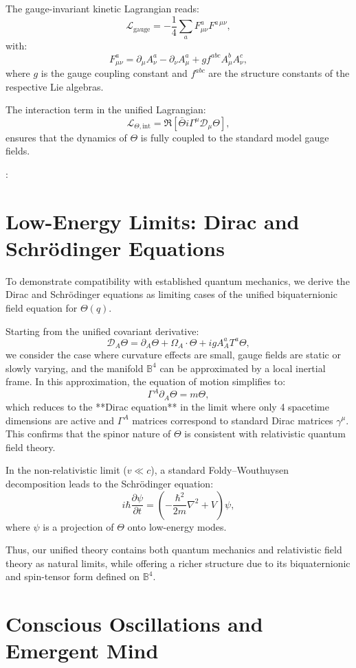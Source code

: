 \documentclass[12pt]{article}
\begin{document}
The gauge-invariant kinetic Lagrangian reads:
\[
\mathcal{L}_{\text{gauge}} = -\frac{1}{4} \sum_a F^{a}_{\mu\nu} F^{a\,\mu\nu},
\]
with:
\[
F^a_{\mu\nu} = \partial_\mu A^a_\nu - \partial_\nu A^a_\mu + g f^{abc} A^b_\mu A^c_\nu,
\]
where \(g\) is the gauge coupling constant and \(f^{abc}\) are the structure constants of the respective Lie algebras.

The interaction term in the unified Lagrangian:
\[
\mathcal{L}_{\Theta, \text{int}} = \Re \left[ \bar{\Theta} i \Gamma^\mu \mathcal{D}_\mu \Theta \right],
\]
ensures that the dynamics of \(\Theta\) is fully coupled to the standard model gauge fields.

:\section{Low-Energy Limits: Dirac and Schrödinger Equations}

To demonstrate compatibility with established quantum mechanics, we derive the Dirac and Schrödinger equations as limiting cases of the unified biquaternionic field equation for \(\Theta(q)\).

Starting from the unified covariant derivative:
\[
\mathcal{D}_A \Theta = \partial_A \Theta + \Omega_A \cdot \Theta + i g A_A^a T^a \Theta,
\]
we consider the case where curvature effects are small, gauge fields are static or slowly varying, and the manifold \(\mathbb{B}^4\) can be approximated by a local inertial frame. In this approximation, the equation of motion simplifies to:
\[
\Gamma^A \partial_A \Theta = m \Theta,
\]
which reduces to the **Dirac equation** in the limit where only 4 spacetime dimensions are active and \(\Gamma^A\) matrices correspond to standard Dirac matrices \(\gamma^\mu\). This confirms that the spinor nature of \(\Theta\) is consistent with relativistic quantum field theory.

In the non-relativistic limit (\(v \ll c\)), a standard Foldy–Wouthuysen decomposition leads to the Schrödinger equation:
\[
i \hbar \frac{\partial \psi}{\partial t} = \left( -\frac{\hbar^2}{2m} \nabla^2 + V \right) \psi,
\]
where \(\psi\) is a projection of \(\Theta\) onto low-energy modes.

Thus, our unified theory contains both quantum mechanics and relativistic field theory as natural limits, while offering a richer structure due to its biquaternionic and spin-tensor form defined on \(\mathbb{B}^4\).

\section{Conscious Oscillations and Emergent Mind}
\end{document}
